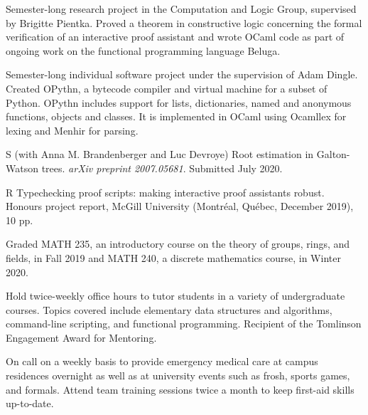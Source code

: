 \smallskip
Semester-long research project in the Computation and Logic Group, supervised
by Brigitte Pientka.
Proved a theorem in constructive logic concerning the formal verification
of an interactive proof assistant and wrote OCaml code as part of
ongoing work on the functional programming language Beluga.
\medskip

\smallskip
Semester-long individual software project under the supervision of Adam Dingle.
Created OPythn, a bytecode compiler and virtual machine for a subset of Python.
OPythn includes support for lists, dictionaries, named and anonymous functions, objects and classes.
It is implemented in OCaml using Ocamllex for lexing and Menhir for parsing.


\pubbegin S
\subitem (with Anna M. Brandenberger and Luc Devroye)
Root estimation in Galton-Watson trees. {\sl arXiv preprint 2007.05681}.
Submitted July 2020.


\pubbegin R
\repitem Typechecking proof scripts: making interactive proof assistants robust.
Honours project report, McGill University (Montr\'eal, Qu\'ebec, December 2019), 10 pp.


\smallskip
Graded MATH 235, an introductory course on the theory of groups, rings, and fields, in Fall 2019
and MATH 240, a discrete mathematics course, in Winter 2020.
\medskip

\filbreak %

\smallskip
Hold twice-weekly office hours to tutor students in a variety of undergraduate courses.
Topics covered include elementary data structures and algorithms, command-line scripting,
and functional programming. Recipient of the Tomlinson Engagement Award for Mentoring.
\medskip

\smallskip
On call on a weekly basis to provide emergency medical care at campus residences overnight as well as at
university events such as frosh, sports games, and formals. Attend team training sessions twice a month to keep
first-aid skills up-to-date.
\medskip

